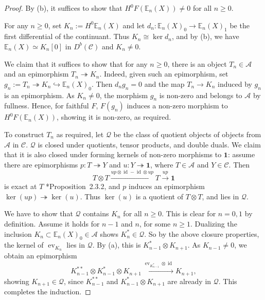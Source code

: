\documentclass[11pt,oneside]{amsart}
\theoremstyle{definition}
\theoremstyle{remark}
\newcommand\EE{\mathbb E}
\newcommand\cA{\mathcal A}
\newcommand\cC{\mathcal C}
\newcommand\cQ{\mathcal Q}
\newcommand\id{\operatorname{id}}
\newcommand\ev{\operatorname{ev}}
\renewcommand\o\otimes
\renewcommand\:\colon
\newcommand\one{\mathbf 1}
\newcommand\tto{\twoheadrightarrow}
\begin{document}
\begin{proof} By (b), it suffices to show that $H^0 F(\EE_n(X))\neq0$ for all $n\ge0$. 

For any $n\ge0$, set $K_n:=H^0\EE_n(X)$ and let $d_n\:\EE_n(X)_0\to\EE_n(X)_1$ be the first differential of the continuant. Thus $K_n\cong\ker d_n$, and by (b), we have $\EE_n(X)\simeq K_n[0]$ in $D^b(\cC)$ and $K_n\neq0$.

We claim that it suffices to show that for any $n\ge0$, there is an object $T_n\in\cA$ and an epimorphism $T_n\tto K_n$.
Indeed, given such an epimorphism, set $g_n:= T_n\tto K_n\hookrightarrow \EE_n(X)_0$. Then $d_n g_n=0$ and the map $T_n\to K_n$ induced by $g_n$ is an epimorphism. As $K_n\neq0$, the morphism $g_n$ is non-zero and belongs to $\cA$ by fullness. Hence, for faithful $F$, $F(g_n)$ induces a non-zero morphism to $H^0 F(\EE_n(X))$, showing it is non-zero, as required.

To construct $T_n$ as required, let $\cQ$ be the class of quotient objects of objects from $\cA$ in $\cC$. $\cQ$ is closed under quotients, tensor products, and double duals. We claim that it is also closed under forming kernels of non-zero morphisms to $\one$: assume there are epimorphisms $p\:T\tto Y$ and $u\:Y\tto\one$, where $T\in\cA$ and $Y\in\cC$. Then 
$$
T\o T \xrightarrow{up\o\id-\id\o up} T\xrightarrow{up} \one
$$
is exact at $T$ \cite{CEOP}*{Proposition~2.3.2}, and $p$ induces an epimorphism $\ker(up)\tto\ker(u)$. Thus $\ker(u)$ is a quotient of $T\o T$, and lies in $\cQ$.

We have to show that $\cQ$ contains $K_n$ for all $n\ge0$. This is clear for $n=0,1$ by definition. Assume it holds for $n-1$ and $n$, for some $n\ge1$. Dualizing the inclusion $K_n\subset \EE_n(X)_0\in\cA$ shows $K_n^*\in\cQ$. So by the above closure properties, the kernel of $\ev_{K_n}$ lies in $\cQ$. By (a), this is $K_{n-1}^*\o K_{n+1}$. As $K_{n-1}\neq0$, we obtain an epimorphism
$$
K_{n-1}^{**} \o K_{n-1}^* \o K_{n+1} \xrightarrow{\ev_{K_{n-1}^*}\o\id} K_{n+1} ,
$$
showing $K_{n+1}\in\cQ$, since $K_{n-1}^{**}$ and $K_{n-1}^*\o K_{n+1}$ are already in $\cQ$. This completes the induction.
\end{proof}
\end{document}
